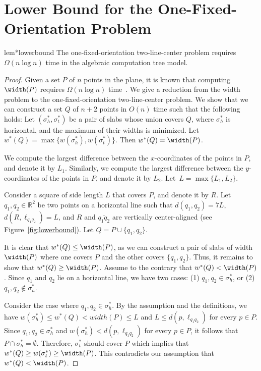 \onefixed*



\section{Lower Bound for the One-Fixed-Orientation Problem}
\label{sec:lowerbound}

\begin{restatable}{lem*}{lowerbound}
    The one-fixed-orientation two-line-center problem requires $\Omega (n\log n)$ time in the algebraic computation tree model. 
\end{restatable}


\begin{proof}
    Given a set $P$ of $n$ points in the plane, it is known that computing $\width(P)$ requires $\Omega(n \log n)$ time~\cite{Houle_width, lee1986geometric}.
    We give a reduction from the width problem to the one-fixed-orientation two-line-center problem.
    We show that we can construct a set $Q$ of $n+2$ points in $O(n)$ time such that the following holds:
    Let $(\sigma_h^*, \sigma_t^*)$ be a pair of slabs whose union covers $Q$, where $\sigma_h^*$ is horizontal, and the maximum of their widths is minimized.
    Let $w^*(Q) = \max\{ w(\sigma_h^*), w(\sigma_t^*)\}$.
    Then $w^*(Q) = \width(P)$.


    
    We compute the largest difference between the $x$-coordinates of the points in $P$, and denote it by $L_1$. Similarly, we compute the largest difference between the $y$-coordinates of the points in $P$, and denote it by $L_2$.
    Let~$L = \max\{L_1, L_2\}$.
    
    Consider a square of side length $L$ that covers $P$, and denote it by $R$.
    Let $q_1, q_2 \in \mathbb{R}^2$ be two points on a horizontal line such that $d(q_1, q_2) = 7L$, $d(R, \ell_{q_1q_2}) = L$, and $R$ and $\overline{q_1q_2}$ are vertically center-aligned (see Figure~\ref{fig:lowerbound}).
    Let $Q = P \cup \{q_1, q_2\}$.

    It is clear that $w^*(Q) \le \width(P)$, as we can construct a pair of slabs of width $\width(P)$ where one covers $P$ and the other covers $\{q_1, q_2\}$. 
    Thus, it remains to show that $w^*(Q) \ge \width(P)$. 
    Assume to the contrary that $w^*(Q) < \width(P)$. 
    Since $q_1$ and $q_2$ lie on a horizontal line, we have two cases: 
    (1) $q_1, q_2 \in \sigma_h^*$, or 
    (2) $q_1, q_2 \notin \sigma_h^*$.


    Consider the case where $q_1, q_2 \in \sigma_h^*$.
    By the assumption and the definitions, we have $w(\sigma_h^*) \le w^*(Q) < width (P) \le L$ and 
    $ L \le d(p, \ell_{q_1q_2})$ for every $p\in P$. 
    Since $q_1, q_2 \in \sigma_h^*$ and $w(\sigma_h^*) < d(p, \ell_{q_1q_2})$ for every $p\in P$, 
    it follows that $P\cap \sigma_h^* = \emptyset$.  
    Therefore, $\sigma_t^*$ should cover $P$ which implies that $w^*(Q) \ge w(\sigma_t^*) \ge \width(P)$. This contradicts our assumption that $w^*(Q) < \width(P)$.


\end{proof}
